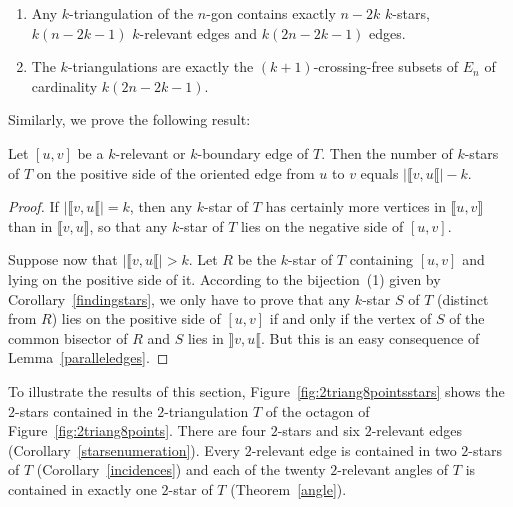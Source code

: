 \documentclass[12pt]{amsart}
\begin{document}
\begin{corollary}\label{starsenumeration}
\begin{enumerate}
\item Any $k$-triangulation of the $n$-gon contains exactly $n-2k$ $k$-stars, $k(n-2k-1)$ $k$-relevant edges and $k(2n-2k-1)$ edges.
\item The $k$-triangulations  are exactly the $(k+1)$-crossing-free subsets of $E_n$ of cardinality $k(2n-2k-1)$.
\end{enumerate}
\end{corollary}

Similarly, we prove the following result:

\begin{corollary}
\label{cor:numberofstars}
Let $[u,v]$ be a $k$-relevant or $k$-boundary edge of $T$. Then the number of $k$-stars of $T$ on the positive side of the oriented edge from $u$ to $v$ equals $|\llbracket v,u\llbracket|-k$.
\end{corollary}

\begin{proof}
If $|\llbracket v,u\llbracket|=k$, then any $k$-star of $T$ has certainly more vertices in $\llbracket u,v\rrbracket$ than in $\llbracket v,u\rrbracket$, so that any $k$-star of $T$ lies on the negative side of $[u,v]$.

Suppose now that $|\llbracket v,u\llbracket|>k$. Let $R$ be the $k$-star of $T$ containing $[u,v]$ and lying on the positive side of it. According to the bijection~(1) given by Corollary~\ref{findingstars}, we only have to prove that any $k$-star $S$ of $T$ (distinct from $R$) lies on the positive side of $[u,v]$ if and only if the vertex of $S$ of the common bisector of $R$ and $S$ lies in $\rrbracket v,u\llbracket$. But this is an easy  consequence of Lemma~\ref{paralleledges}.
\end{proof}

\begin{example}
\rm
To illustrate the results of this section, Figure~\ref{fig:2triang8pointsstars} shows the $2$-stars contained in the $2$-triangulation $T$ of the octagon of Figure~\ref{fig:2triang8points}. There are four $2$-stars and six $2$-relevant edges (Corollary~\ref{starsenumeration}). Every $2$-relevant edge is contained in two $2$-stars of $T$ (Corollary~\ref{incidences}) and each of the twenty $2$-relevant angles of $T$ is contained in exactly one $2$-star of $T$ (Theorem~\ref{angle}).
\end{example}
\end{document}
